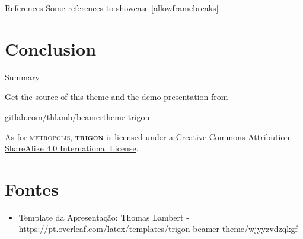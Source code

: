 \documentclass[aspectratio=169]{beamer}
\newcommand{\themename}{\textbf{\textsc{trigon}}\xspace}
\begin{document}
\begin{frame}{References}
  Some references to showcase [allowframebreaks] \cite{knuth92,ConcreteMath,Simpson,Er01,greenwade93}
\end{frame}

\section{Conclusion}
\begin{frame}{Summary}

  Get the source of this theme and the demo presentation from

  \begin{center}\url{gitlab.com/thlamb/beamertheme-trigon}\end{center}

  As for \textsc{metropolis}, \themename is licensed under a
  \href{http://creativecommons.org/licenses/by-sa/4.0/}{Creative Commons
  Attribution-ShareAlike 4.0 International License}.

  \begin{center}\ccbysa\end{center}
	
\end{frame}

\section{Fontes}
\begin{frame}
	\begin{itemize}
		\item Template da Apresentação: Thomas Lambert - https://pt.overleaf.com/latex/templates/trigon-beamer-theme/wjyyzvdzqkgf
	\end{itemize}
\end{frame}
\end{document}
